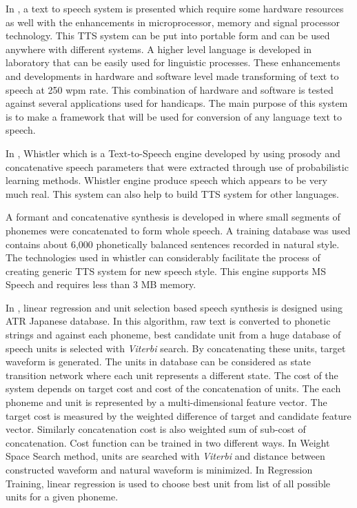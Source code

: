 In \cite{carlson1982multi}, a text to speech system is presented which require some hardware resources as well with the enhancements in microprocessor, 
memory and signal processor technology. This TTS system can be put into portable form and can be used anywhere with different systems. A higher level language is
developed in laboratory that can be easily used for linguistic processes. These enhancements and developments in hardware
and software level made transforming of text to speech at 250 wpm rate. This combination of hardware and software is tested
against several applications used for handicaps. The main purpose of this system is to make a framework that will
be used for conversion of any language text to speech. 

In \cite{huang1996whistler}, Whistler which is a Text-to-Speech engine developed by using prosody and
concatenative speech parameters that were extracted through use of probabilistic learning methods. Whistler engine produce
speech which appears to be very much real. This system can also help to build TTS system for other languages.

A formant and concatenative synthesis is developed in \cite{huang1997recent}
where small segments of phonemes were concatenated to form whole speech. A training database was used contains about 6,000 phonetically balanced sentences recorded in natural style. The technologies used in whistler can considerably facilitate the
process of creating generic TTS system for new speech style. This engine supports MS Speech and requires less than 3 MB memory.

In \cite{hunt1996unit}, linear regression and unit selection 
based speech synthesis is designed using ATR Japanese database. In this algorithm, raw text is converted to phonetic strings and against each phoneme, best candidate unit from a huge database of speech units is selected with \textit{Viterbi} search. By concatenating these units, target waveform is generated. The units in database can be considered as state transition network where each unit represents a different state. The cost of the system depends on target cost and cost of the concatenation of units. The each phoneme and unit is represented by a multi-dimensional feature vector. The target cost is measured by the weighted difference of target and candidate feature vector. Similarly concatenation cost is also weighted sum of sub-cost of concatenation. Cost function can be trained in two different ways. In Weight Space Search method, units are searched with \textit{Viterbi} and distance between constructed waveform and
natural waveform is minimized. In Regression Training, linear regression is used to choose best unit from list of all possible
units for a given phoneme. 

